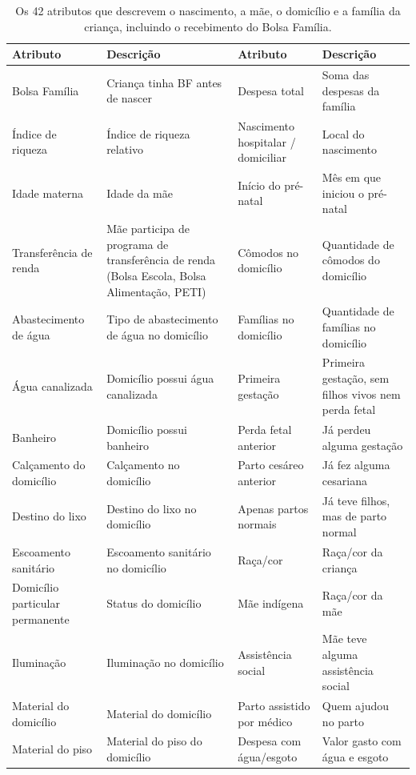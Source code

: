 \begin{table}[H]
\caption{Os 42 atributos que descrevem o nascimento, a mãe, o domicílio e a família da criança, incluindo o recebimento do Bolsa Família.}\label{tab:met-atributos}
\scriptsize\setlength{\tabcolsep}{3pt}\renewcommand{\arraystretch}{0.95}
\begin{tabularx}{\textwidth}{@{}L{3.1cm}Y@{\hspace{10pt}}L{3.1cm}Y@{}}
\toprule
Atributo & Descrição & Atributo & Descrição\\
\midrule
Bolsa Família & Criança tinha BF antes de nascer & Despesa total & Soma das despesas da família\\
Índice de riqueza & Índice de riqueza relativo & Nascimento hospitalar / domiciliar & Local do nascimento\\
Idade materna & Idade da mãe & Início do pré-natal & Mês em que iniciou o pré-natal\\
Transferência de renda & Mãe participa de programa de transferência de renda (Bolsa Escola, Bolsa Alimentação, PETI) & Cômodos no domicílio & Quantidade de cômodos do domicílio\\
Abastecimento de água & Tipo de abastecimento de água no domicílio & Famílias no domicílio & Quantidade de famílias no domicílio\\
Água canalizada & Domicílio possui água canalizada & Primeira gestação & Primeira gestação, sem filhos vivos nem perda fetal\\
Banheiro & Domicílio possui banheiro & Perda fetal anterior & Já perdeu alguma gestação\\
Calçamento do domicílio & Calçamento no domicílio & Parto cesáreo anterior & Já fez alguma cesariana\\
Destino do lixo & Destino do lixo no domicílio & Apenas partos normais & Já teve filhos, mas de parto normal\\
Escoamento sanitário & Escoamento sanitário no domicílio & Raça/cor & Raça/cor da criança\\
Domicílio particular permanente & Status do domicílio & Mãe indígena & Raça/cor da mãe\\
Iluminação & Iluminação no domicílio & Assistência social & Mãe teve alguma assistência social\\
Material do domicílio & Material do domicílio & Parto assistido por médico & Quem ajudou no parto\\
Material do piso & Material do piso do domicílio & Despesa com água/esgoto & Valor gasto com água e esgoto\\

\end{tabularx}
\end{table}
